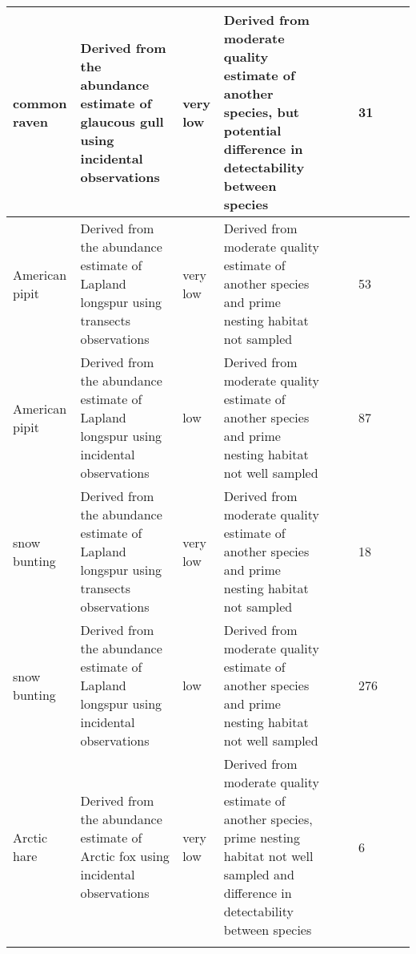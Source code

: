 \begin{longtable}{|p{}|p{}|p{}|p{}|p{}|p{}|p{}|p{}|p{}|}
   \hline
common raven & Derived from the abundance estimate of glaucous gull using incidental observations & very low & Derived from moderate quality estimate of another species, but potential difference in detectability between species &  &  & 31 &  &  \\ 
   \hline
American pipit & Derived from the abundance estimate of Lapland longspur using transects observations & very low & Derived from moderate quality estimate of another species and prime nesting habitat not sampled &  &  & 53 &  &  \\ 
   \hline
American pipit & Derived from the abundance estimate of Lapland longspur using incidental observations & low & Derived from moderate quality estimate of another species and prime nesting habitat not well sampled &  &  & 87 &  &  \\ 
   \hline
snow bunting & Derived from the abundance estimate of Lapland longspur using transects observations & very low & Derived from moderate quality estimate of another species and prime nesting habitat not sampled &  &  & 18 &  &  \\ 
   \hline
snow bunting & Derived from the abundance estimate of Lapland longspur using incidental observations & low & Derived from moderate quality estimate of another species and prime nesting habitat not well sampled &  &  & 276 &  &  \\ 
   \hline
Arctic hare & Derived from the abundance estimate of Arctic fox using incidental observations & very low & Derived from moderate quality estimate of another species, prime nesting habitat not well sampled and difference in detectability between species &  &  & 6 &  &  \\ 
   \hline
\hline
\label{table:summary_methods}
\end{longtable}
\endgroup
